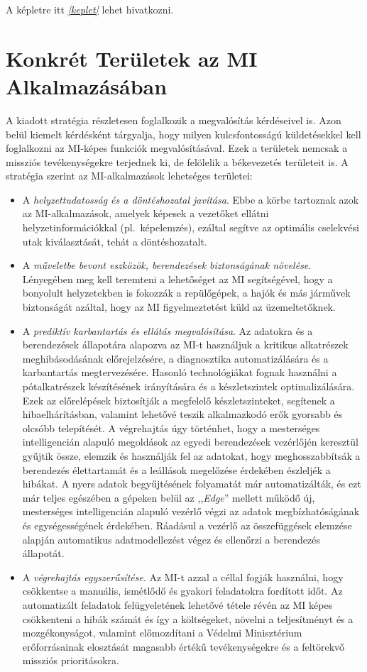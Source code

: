 \documentclass[
]{thesis-ekf}
\theoremstyle{definition}
\theoremstyle{remark}
\begin{document}
A képletre itt \emph{\ref{keplet}} lehet hivatkozni.

\section{Konkrét Területek az MI Alkalmazásában}
A kiadott stratégia részletesen foglalkozik a megvalósítás kérdéseivel is. Azon belül kiemelt kérdésként tárgyalja, hogy milyen kulcsfontosságú küldetésekkel kell foglalkozni az MI-képes funkciók megvalósításával. Ezek a területek nemcsak a missziós tevékenységekre terjednek ki, de felölelik a békevezetés területeit is. A stratégia szerint az MI-alkalmazások lehetséges területei:

\begin{itemize}
	\item A \emph{helyzettudatosság és a döntéshozatal javítása}. Ebbe a körbe tartoznak azok az MI-alkalmazások, amelyek képesek a vezetőket ellátni helyzetinformációkkal (pl.~képelemzés), ezáltal segítve az optimális cselekvési utak kiválasztását, tehát a döntéshozatalt.
	\item A \emph{műveletbe bevont eszközök, berendezések biztonságának növelése}. Lényegében meg kell teremteni a lehetőséget az MI segítségével, hogy a bonyolult helyzetekben is fokozzák a repülőgépek, a hajók és más járművek biztonságát azáltal, hogy az MI figyelmeztetést küld az üzemeltetőknek.
	\item A \emph{prediktív karbantartás és ellátás megvalósítása}. Az adatokra és a berendezések állapotára alapozva az MI-t használjuk a kritikus alkatrészek meghibásodásának előrejelzésére, a diagnosztika automatizálására és a karbantartás megtervezésére. Hasonló technológiákat fognak használni a pótalkatrészek készítésének irányítására és a készletszintek optimalizálására. Ezek az előrelépések biztosítják a megfelelő készletszinteket, segítenek a hibaelhárításban, valamint lehetővé teszik alkalmazkodó erők gyorsabb és olcsóbb telepítését. A végrehajtás úgy történhet, hogy a mesterséges intelligencián alapuló megoldások az egyedi berendezések vezérlőjén keresztül gyűjtik össze, elemzik és használják fel az adatokat, hogy meghosszabbítsák a berendezés élettartamát és a leállások megelőzése érdekében észleljék a hibákat. A nyers adatok begyűjtésének folyamatát már automatizálták, és ezt már teljes egészében a gépeken belül az ,,\emph{Edge}'' mellett működő új, mesterséges intelligencián alapuló vezérlő végzi az adatok megbízhatóságának és egységességének érdekében. Ráadásul a vezérlő az összefüggések elemzése alapján automatikus adatmodellezést végez és ellenőrzi a berendezés állapotát.
	\item A \emph{végrehajtás egyszerűsítése}. Az MI-t azzal a céllal fogják használni, hogy csökkentse a manuális, ismétlődő és gyakori feladatokra fordított időt. Az automatizált feladatok felügyeletének lehetővé tétele révén az MI képes csökkenteni a hibák számát és így a költségeket, növelni a teljesítményt és a mozgékonyságot, valamint előmozdítani a  Védelmi Minisztérium erőforrásainak elosztását magasabb értékű tevékenységekre és a feltörekvő missziós prioritásokra.
	
	\cite{AllenChan,Goodfellow}
\end{itemize}
\end{document}
